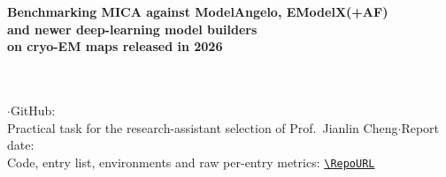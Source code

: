 \documentclass[11pt,a4paper]{article}
\begin{document}
\begin{center}
{\sffamily\LARGE\bfseries Benchmarking MICA against ModelAngelo, EModelX(+AF)\\[0.3ex] and newer deep-learning model builders\\[0.3ex] on cryo-EM maps released in 2026\par}
\vspace{1.2ex}
{\large\AuthorName}\\[0.2ex]
{\small\AuthorAffiliation}\\[0.2ex]
{\small\AuthorEmail\quad$\cdot$\quad GitHub: \href{https://github.com/\GitHubUser}{\texttt{\GitHubUser}}}\\[0.2ex]
{\small Practical task for the research-assistant selection of Prof.\ Jianlin Cheng\quad$\cdot$\quad Report date: \ReportDate}\\[0.2ex]
{\small Code, entry list, environments and raw per-entry metrics: \href{\RepoURL}{\nolinkurl{\RepoURL}}}
\end{center}
\vspace{0.6ex}

















\clearpage
\appendix

\end{document}
